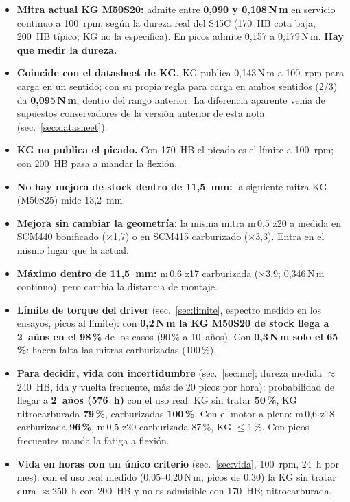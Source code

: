 \documentclass[11pt,a4paper]{article}
\newcommand{\Nm}{\,N\,m\xspace}
\begin{document}
\begin{itemize}
  \item \textbf{Mitra actual KG M50S20:} admite entre \textbf{0,090 y 0,108\Nm} en servicio continuo a 100~rpm, según la dureza
        real del S45C (170~HB cota baja, 200~HB típico; KG no la especifica). En picos admite 0,157 a 0,179\Nm. \textbf{Hay que medir la dureza.}
  \item \textbf{Coincide con el datasheet de KG.} KG publica 0,143\Nm a 100~rpm para carga en un sentido; con su propia regla
        para carga en ambos sentidos (2/3) da \textbf{0,095\Nm}, dentro del rango anterior. La diferencia aparente venía de
        supuestos conservadores de la versión anterior de esta nota (sec.~\ref{sec:datasheet}).
  \item \textbf{KG no publica el picado.} Con 170~HB el picado es el límite a 100~rpm; con 200~HB pasa a mandar la flexión.
  \item \textbf{No hay mejora de stock dentro de 11,5~mm:} la siguiente mitra KG (M50S25) mide 13,2~mm.
  \item \textbf{Mejora sin cambiar la geometría:} la misma mitra m\,0,5 z20 a medida en SCM440 bonificado (×1,7)
        o en SCM415 carburizado (×3,3). Entra en el mismo lugar que la actual.
  \item \textbf{Máximo dentro de 11,5~mm:} m\,0,6 z17 carburizada (×3,9; 0,346\Nm continuo), pero cambia la distancia de montaje.
  \item \textbf{Límite de torque del driver} (sec.~\ref{sec:limite}, espectro medido en los ensayos, picos al límite):
        con \textbf{0,2\Nm la KG M50S20 de stock llega a 2~años en el 98\,\%} de los casos (90\,\% a 10~años). Con
        \textbf{0,3\Nm solo el 65\,\%}: hacen falta las mitras carburizadas (100\,\%).
  \item \textbf{Para decidir, vida con incertidumbre} (sec.~\ref{sec:mc}; dureza medida $\approx$240~HB, ida y vuelta frecuente, más de
        20 picos por hora): probabilidad de llegar a \textbf{2~años (576~h)} con el uso real: KG sin tratar \textbf{50\,\%},
        KG nitrocarburada \textbf{79\,\%}, carburizadas \textbf{100\,\%}. Con el motor a pleno: m\,0,6 z18 carburizada
        \textbf{96\,\%}, m\,0,5 z20 carburizada 87\,\%, KG $\le$1\,\%. Con picos frecuentes manda la fatiga a flexión.
  \item \textbf{Vida en horas con un único criterio} (sec.~\ref{sec:vida}, 100~rpm, 24~h por mes): con el uso real medido
        (0,05--0,20\Nm, picos de 0,30) la KG sin tratar dura $\approx$250~h con 200~HB y no es admisible con 170~HB; nitrocarburada,

\end{itemize}
\end{document}
